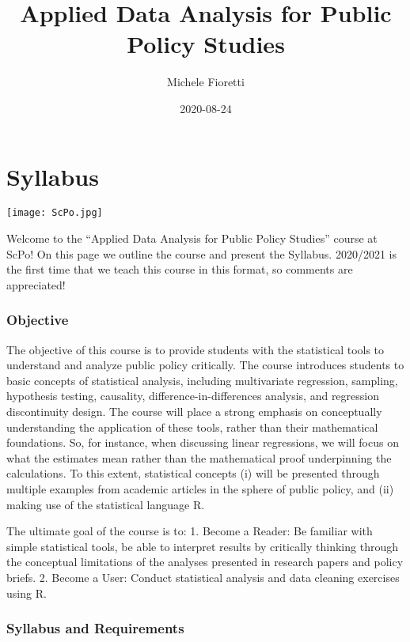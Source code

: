 \documentclass[]{book}
\title{Applied Data Analysis for Public Policy Studies}
\author{Michele Fioretti}
\date{2020-08-24}
\begin{document}
\maketitle

{
\setcounter{tocdepth}{1}
\tableofcontents
}
\hypertarget{syllabus}{%
\chapter*{Syllabus}\label{syllabus}}

\texttt{[image: ScPo.jpg]}

Welcome to the ``Applied Data Analysis for Public Policy Studies'' course at ScPo! On this page we outline the course and present the Syllabus. 2020/2021 is the first time that we teach this course in this format, so comments are appreciated!

\hypertarget{objective}{%
\subsection*{Objective}\label{objective}}

The objective of this course is to provide students with the statistical tools to understand and analyze public policy critically. The course introduces students to basic concepts of statistical analysis, including multivariate regression, sampling, hypothesis testing, causality, difference-in-differences analysis, and regression discontinuity design. The course will place a strong emphasis on conceptually understanding the application of these tools, rather than their mathematical foundations. So, for instance, when discussing linear regressions, we will focus on what the estimates mean rather than the mathematical proof underpinning the calculations. To this extent, statistical concepts (i) will be presented through multiple examples from academic articles in the sphere of public policy, and (ii) making use of the statistical language R.

The ultimate goal of the course is to:
1. Become a Reader: Be familiar with simple statistical tools, be able to interpret results by critically thinking through the conceptual limitations of the analyses presented in research papers and policy briefs.
2. Become a User: Conduct statistical analysis and data cleaning exercises using R.

\hypertarget{syllabus-and-requirements}{%
\subsection*{Syllabus and Requirements}\label{syllabus-and-requirements}}
\end{document}
